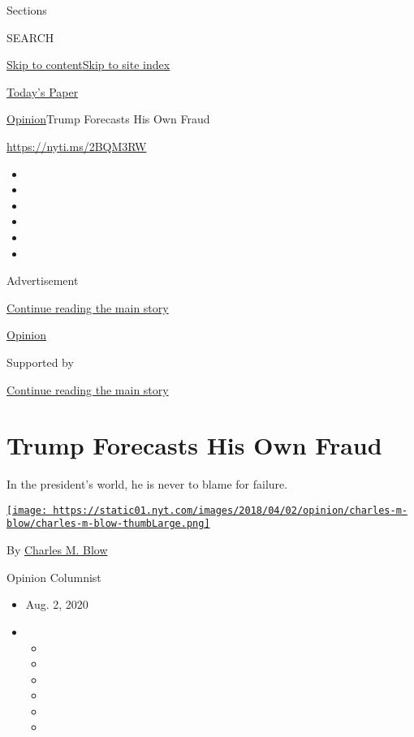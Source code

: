 Sections

SEARCH

\protect\hyperlink{site-content}{Skip to
content}\protect\hyperlink{site-index}{Skip to site index}

\href{https://myaccount.nytimes.com/auth/login?response_type=cookie\&client_id=vi}{}

\href{https://www.nytimes.com/section/todayspaper}{Today's Paper}

\href{/section/opinion}{Opinion}\textbar{}Trump Forecasts His Own Fraud

\url{https://nyti.ms/2BQM3RW}

\begin{itemize}
\item
\item
\item
\item
\item
\item
\end{itemize}

Advertisement

\protect\hyperlink{after-top}{Continue reading the main story}

\href{/section/opinion}{Opinion}

Supported by

\protect\hyperlink{after-sponsor}{Continue reading the main story}

\hypertarget{trump-forecasts-his-own-fraud}{%
\section{Trump Forecasts His Own
Fraud}\label{trump-forecasts-his-own-fraud}}

In the president's world, he is never to blame for failure.

\href{https://www.nytimes.com/by/charles-m-blow}{\texttt{[image: https://static01.nyt.com/images/2018/04/02/opinion/charles-m-blow/charles-m-blow-thumbLarge.png]}}

By \href{https://www.nytimes.com/by/charles-m-blow}{Charles M. Blow}

Opinion Columnist

\begin{itemize}
\item
  Aug. 2, 2020
\item
  \begin{itemize}
  \item
  \item
  \item
  \item
  \item
  \item
  \end{itemize}
\end{itemize}

